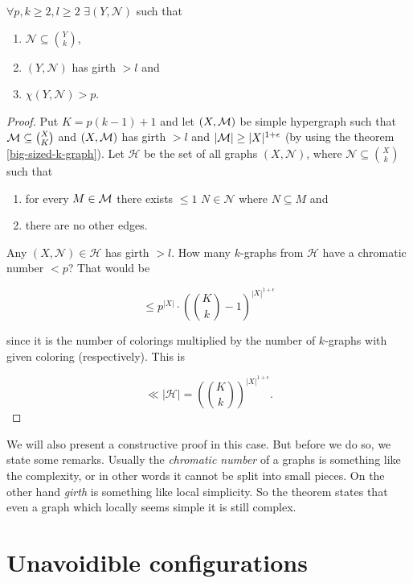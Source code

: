 \begin{cor}
	$\forall p, k \geq 2, l \geq 2$ $\exists (Y, \mathcal{N})$ such that
	
	\begin{enumerate}
		\item $\mathcal{N} \subseteq \binom{Y}{k}$,
		\item $(Y, \mathcal{N})$ has girth $> l$ and
		\item $\chi(Y, \mathcal{N}) > p$.
	\end{enumerate}
	\label{chromatic-girth}
\end{cor}

\begin{proof}
	Put $K = p (k-1) + 1$ and let $(X, \mathcal{M})$ be simple hypergraph such that $\mathcal{M} \subseteq \binom{X}{K}$ and $(X, \mathcal{M})$ has girth $> l$ and $|\mathcal{M}| \geq |X|^{1+\epsilon}$ (by using the theorem \ref{big-sized-k-graph}). Let $\mathcal{H}$ be the set of all graphs $(X, \mathcal{N})$, where $\mathcal{N} \subseteq \binom{X}{k}$ such that
	
	\begin{enumerate}
		\item for every $M \in \mathcal{M}$ there exists $\leq 1$ $N \in \mathcal{N}$ where $N \subseteq M$ and
		\item there are no other edges.
	\end{enumerate}
	
	\noindent Any $(X, \mathcal{N}) \in \mathcal{H}$ has girth $> l$. How many $k$-graphs from $\mathcal{H}$ have a chromatic number $< p$? That would be
	
	$$
	\leq p^{|X|} \cdot \left(\binom{K}{k} - 1\right)^{|X|^{1 + \epsilon}}
	$$
	
	\noindent since it is the number of colorings multiplied by the number of $k$-graphs with given coloring (respectively). This is
	
	$$
	\ll |\mathcal{H}| = \left(\binom{K}{k}\right)^{|X|^{1 + \epsilon}}.
	$$
\end{proof}

We will also present a constructive proof in this case. But before we do so, we state some remarks. Usually the \textit{chromatic number} of a graphs is something like the complexity, or in other words it cannot be split into small pieces. On the other hand \textit{girth} is something like local simplicity. So the theorem states that even a graph which locally seems simple it is still complex.

\section{Unavoidible configurations}


